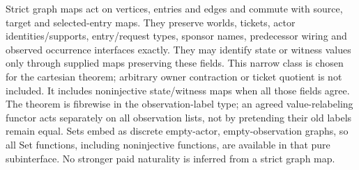 \documentclass[11pt]{article}
\begin{document}
Strict graph maps act on vertices, entries and edges and commute with source, target and selected-entry maps. They preserve worlds, tickets, actor identities/supports, entry/request types, sponsor names, predecessor wiring and observed occurrence interfaces exactly. They may identify state or witness values only through supplied maps preserving these fields. This narrow class is chosen for the cartesian theorem; arbitrary owner contraction or ticket quotient is not included. It includes noninjective state/witness maps when all those fields agree. The theorem is fibrewise in the observation-label type; an agreed value-relabeling functor acts separately on all observation lists, not by pretending their old labels remain equal. Sets embed as discrete empty-actor, empty-observation graphs, so all Set functions, including noninjective functions, are available in that pure subinterface. No stronger paid naturality is inferred from a strict graph map.
\end{document}
